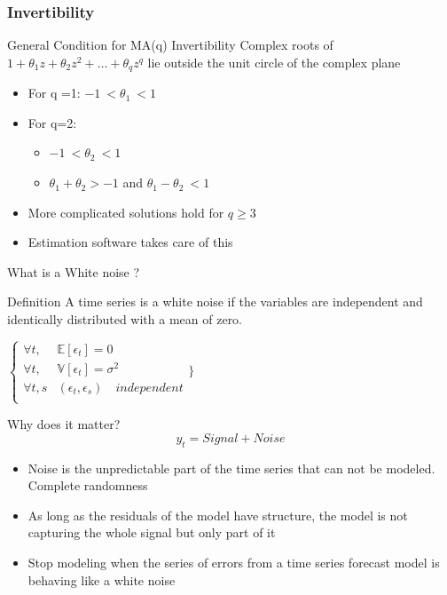 \documentclass{beamer}
\def\Esp{\mathbb{E}}
\def\Var{\mathbb{V}}
\begin{document}
\begin{frame}
  \frametitle{Invertibility}

  \begin{alertblock}{General Condition for MA(q) Invertibility}
    Complex roots of $1 + \theta_1z + \theta_2 z^2 + \dots + \theta_q z^q$ lie outside the unit circle of the complex plane
  \end{alertblock}

  \smallskip

  \begin{itemize}
  \item For q =1: $-1 \ < \theta_1 \ <1$
  \item For q=2:
    \begin{itemize}
    \item $-1 \ < \theta_2 \ <1$
    \item $\theta_1 + \theta_2 > -1$ and $\theta_1 - \theta_2 \ < 1$
    \end{itemize}
  \item More complicated solutions hold for $q \geq 3$
  \item Estimation software takes care of this
  \end{itemize}
  
\end{frame}

\begin{frame}{What is a White noise ?}
\begin{block}{Definition}
A time series is a white noise if the variables are independent and identically distributed with a mean of zero.
\begin{center}
${\left\{\begin{matrix}
 \forall t, & \Esp[\epsilon_t] = 0 \\
 \forall t, & \Var[\epsilon_t] = \sigma^2 \\
 \forall t,s & (\epsilon_t, \epsilon_{s}) \quad independent \\    
\end{matrix}\right.\}}$    
\end{center}
\end{block}

Why does it matter?
$$y_t = Signal + Noise $$
    \begin{itemize}
        \item Noise is the unpredictable part of the time series that can not be modeled. Complete randomness 
        \item As long as the residuals of the model have structure, the model is not capturing the whole signal but only part of it
        \item Stop modeling when the series of errors from a time series forecast model is behaving like a white noise
    \end{itemize} 
\end{frame}
\end{document}
